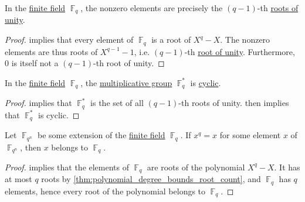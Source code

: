 \begin{lemma}\label{thm:finite_domain_roots_of_unity}
  In the \hyperref[def:finite_field]{finite field} \( \BbbF_q \), the nonzero elements are precisely the \( (q - 1) \)-th \hyperref[def:root_of_unity]{roots of unity}.
\end{lemma}
\begin{proof}
   implies that every element of \( \BbbF_q \) is a root of \( X^q - X \). The nonzero elements are thus roots of \( X^{q - 1} - 1 \), i.e. \( (q - 1) \)-th \hyperref[def:root_of_unity]{root of unity}. Furthermore, \( 0 \) is itself not a \( (q - 1) \)-th root of unity.
\end{proof}

\begin{proposition}\label{thm:finite_field_multiplicative_group_is_cyclic}
  In the \hyperref[def:finite_field]{finite field} \( \BbbF_q \), the \hyperref[def:semiring]{multiplicative group} \( \BbbF_q^* \) is
  \hyperref[def:cyclic_group]{cyclic}.
\end{proposition}
\begin{proof}
   implies that \( \BbbF_q^* \) is the set of all \( (q - 1) \)-th roots of unity.  then implies that \( \BbbF_q^* \) is cyclic.
\end{proof}

\begin{lemma}\label{thm:finite_field_roots_of_splitting_polynomial}
  Let \( \BbbF_{q^n} \) be some extension of the \hyperref[def:finite_field]{finite field} \( \BbbF_q \). If \( x^q = x \) for some element \( x \) of \( \BbbF_{q^n} \), then \( x \) belongs to \( \BbbF_q \).
\end{lemma}
\begin{proof}
   implies that the elements of \( \BbbF_q \) are roots of the polynomial \( X^q - X \). It has at most \( q \) roots by \cref{thm:polynomial_degree_bounds_root_count}, and \( \BbbF_q \) has \( q \) elements, hence every root of the polynomial belongs to \( \BbbF_q \).
\end{proof}

